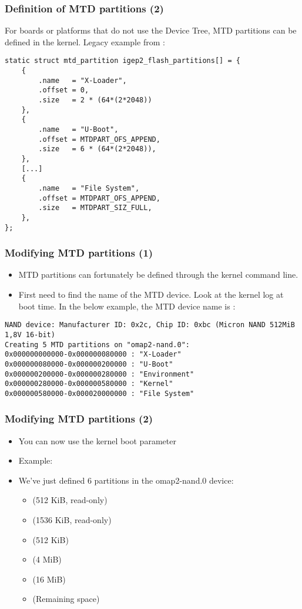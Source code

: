 \begin{frame}[fragile]
  \frametitle{Definition of MTD partitions (2)}
  For boards or platforms that do not use the Device Tree,
  MTD partitions can be defined in the kernel.
  Legacy example from :
\begin{verbatim}
static struct mtd_partition igep2_flash_partitions[] = {
    {
        .name   = "X-Loader",
        .offset = 0,
        .size   = 2 * (64*(2*2048))
    },
    {
        .name   = "U-Boot",
        .offset = MTDPART_OFS_APPEND,
        .size   = 6 * (64*(2*2048)),
    },
    [...]
    {
        .name   = "File System",
        .offset = MTDPART_OFS_APPEND,
        .size   = MTDPART_SIZ_FULL,
    },
};
\end{verbatim}
\end{frame}

\begin{frame}[fragile]
  \frametitle{Modifying MTD partitions (1)}
  \begin{itemize}
  \item MTD partitions can fortunately be defined through the kernel
    command line.
  \item First need to find the name of the MTD device. Look at the
    kernel log at boot time. In the below example, the MTD device name is
    :
\end{itemize}
\tiny
\begin{verbatim}
NAND device: Manufacturer ID: 0x2c, Chip ID: 0xbc (Micron NAND 512MiB 1,8V 16-bit)
Creating 5 MTD partitions on "omap2-nand.0":
0x000000000000-0x000000080000 : "X-Loader"
0x000000080000-0x000000200000 : "U-Boot"
0x000000200000-0x000000280000 : "Environment"
0x000000280000-0x000000580000 : "Kernel"
0x000000580000-0x000020000000 : "File System"
\end{verbatim}
\end{frame}

\begin{frame}
  \frametitle{Modifying MTD partitions (2)}
  \begin{itemize}
  \item You can now use the  kernel boot parameter
  \item Example:\\
  \item We've just defined 6 partitions in the omap2-nand.0 device:
    \begin{itemize}
    \item {} (512 KiB, read-only)
    \item {} (1536 KiB, read-only)
    \item {} (512 KiB)
    \item {} (4 MiB)
    \item {} (16 MiB)
    \item {} (Remaining space)
    \end{itemize}
  \end{itemize}
\end{frame}

